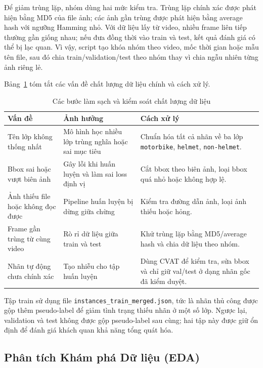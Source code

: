Để giảm trùng lặp, nhóm dùng hai mức kiểm tra. Trùng lặp chính xác được phát hiện bằng MD5 của file ảnh; các ảnh gần trùng được phát hiện bằng average hash với ngưỡng Hamming nhỏ. Với dữ liệu lấy từ video, nhiều frame liên tiếp thường gần giống nhau; nếu đưa đồng thời vào train và test, kết quả đánh giá có thể bị lạc quan. Vì vậy, script tạo khóa nhóm theo video, mốc thời gian hoặc mẫu tên file, sau đó chia train/validation/test theo nhóm thay vì chia ngẫu nhiên từng ảnh riêng lẻ.

Bảng~\ref{tab:data-cleaning-steps} tóm tắt các vấn đề chất lượng dữ liệu chính và cách xử lý.

\begin{table}[H]
    \centering
    \small
    \caption{Các bước làm sạch và kiểm soát chất lượng dữ liệu}
    \label{tab:data-cleaning-steps}
    \begin{tabularx}{\textwidth}{l X X}
        \toprule
        \textbf{Vấn đề} & \textbf{Ảnh hưởng} & \textbf{Cách xử lý} \\
        \midrule
        Tên lớp không thống nhất & Mô hình học nhiều lớp trùng nghĩa hoặc sai mục tiêu & Chuẩn hóa tất cả nhãn về ba lớp \texttt{motorbike}, \texttt{helmet}, \texttt{non-helmet}. \\
        Bbox sai hoặc vượt biên ảnh & Gây lỗi khi huấn luyện và làm sai loss định vị & Cắt bbox theo biên ảnh, loại bbox quá nhỏ hoặc không hợp lệ. \\
        Ảnh thiếu file hoặc không đọc được & Pipeline huấn luyện bị dừng giữa chừng & Kiểm tra đường dẫn ảnh, loại ảnh thiếu hoặc hỏng. \\
        Frame gần trùng từ cùng video & Rò rỉ dữ liệu giữa train và test & Khử trùng lặp bằng MD5/average hash và chia dữ liệu theo nhóm. \\
        Nhãn tự động chưa chính xác & Tạo nhiễu cho tập huấn luyện & Dùng CVAT để kiểm tra, sửa bbox và chỉ giữ val/test ở dạng nhãn gốc đã kiểm duyệt. \\
        \bottomrule
    \end{tabularx}
\end{table}

Tập train sử dụng file \texttt{instances\_train\_merged.json}, tức là nhãn thủ công được gộp thêm pseudo-label để giảm tình trạng thiếu nhãn ở một số lớp. Ngược lại, validation và test không được gộp pseudo-label sau cùng; hai tập này được giữ ổn định để đánh giá khách quan khả năng tổng quát hóa.

\subsection{Phân tích Khám phá Dữ liệu (EDA)}

